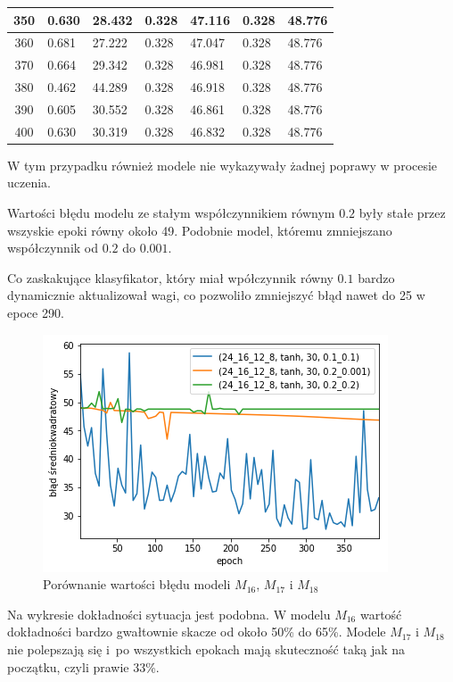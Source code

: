 \begin{longtable}{|c|l|l|l|l|l|l|}
        350 & 0.630 & 28.432 & 0.328 & 47.116 & 0.328 & 48.776 \\ \hline
        360 & 0.681 & 27.222 & 0.328 & 47.047 & 0.328 & 48.776 \\ \hline
        370 & 0.664 & 29.342 & 0.328 & 46.981 & 0.328 & 48.776 \\ \hline
        380 & 0.462 & 44.289 & 0.328 & 46.918 & 0.328 & 48.776 \\ \hline
        390 & 0.605 & 30.552 & 0.328 & 46.861 & 0.328 & 48.776 \\ \hline
        400 & 0.630 & 30.319 & 0.328 & 46.832 & 0.328 & 48.776 \\ \hline
    \end{longtable}

    W tym przypadku również modele nie wykazywały żadnej poprawy w procesie uczenia.

    Wartości błędu modelu ze stałym współczynnikiem równym $0.2$ były stałe przez wszyskie epoki równy około 49.
    Podobnie model, któremu zmniejszano współczynnik od $0.2$ do $0.001$.

    Co zaskakujące klasyfikator, który miał wpółczynnik równy $0.1$ bardzo dynamicznie aktualizował wagi, co pozwoliło zmniejszyć błąd nawet do 25 w epoce 290.

    \begin{figure}[htp]
        \centering
        \includegraphics[scale=0.8]{./img/lr-error-tanh.png}
        \caption{Porównanie wartości błędu modeli $M_{16}$, $M_{17}$ i $M_{18}$}
    \end{figure}

    Na wykresie dokładności sytuacja jest podobna.
    W modelu $M_{16}$ wartość dokładności bardzo gwałtownie skacze od około 50\% do 65\%.
    Modele $M_{17}$ i $M_{18}$ nie polepszają się i~po wszystkich epokach mają skuteczność taką jak na początku, czyli prawie 33\%.


